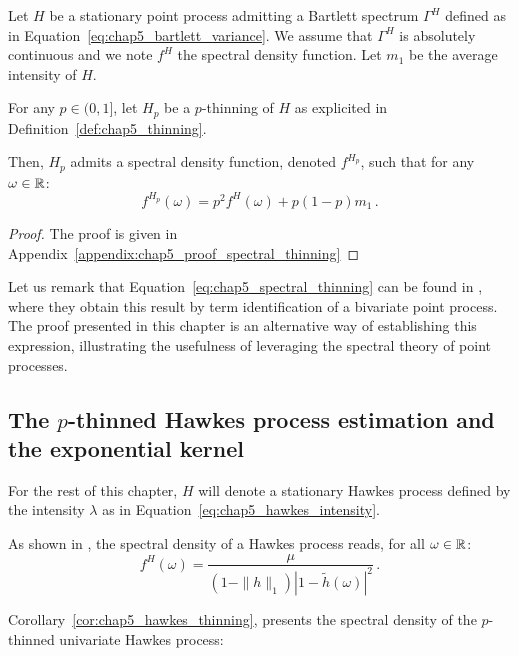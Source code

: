 \begin{proposition}\label{prop:chap5_spectral_thinning}
    Let $H$ be a stationary point process admitting a Bartlett spectrum $\Gamma^H$ defined as in Equation~\eqref{eq:chap5_bartlett_variance}.
    We assume that $\Gamma^H$ is absolutely continuous and we note $f^H$ the spectral density function. 
    Let $m_1$ be the average intensity of $H$.

    For any $p\in(0,1]$, let $H_p$ be a $p$-thinning of $H$ as explicited in Definition~\ref{def:chap5_thinning}.

    Then, $H_p$ admits a spectral density function, denoted $f^{H_p}$, such that for any $\omega\in{\mathbb R}$:
    \begin{equation}\label{eq:chap5_spectral_thinning}
        f^{H_p}(\omega) = p^2 f^H(\omega) + p(1-p)m_1\,.
    \end{equation}

\end{proposition}

\begin{proof}
    The proof is given in Appendix~\ref{appendix:chap5_proof_spectral_thinning}
\end{proof}

    Let us remark that Equation~\eqref{eq:chap5_spectral_thinning} can be found in \textcite[Equation 8.3.5]{DaleyV1}, where they obtain this result by term identification of a bivariate point process. 
    The proof presented in this chapter is an alternative way of establishing this expression,
    illustrating the usefulness of leveraging the spectral theory of point processes.


    \subsection{The $p$-thinned Hawkes process estimation and the exponential kernel}\label{sec:chap5_thinned_hawkes}

    For the rest of this chapter, 
    $H$ will denote a stationary Hawkes process defined by the intensity $\lambda$ as in Equation~\eqref{eq:chap5_hawkes_intensity}.

    As shown in \textcite{Hawkes1971}, the spectral density of a Hawkes process reads, for all $\omega\in{\mathbb R}$:
    \[f^H(\omega) = \frac{\mu}{(1-\|h\|_1)|1-\tilde h(\omega)|^2}\,.\]

    Corollary~\ref{cor:chap5_hawkes_thinning}, presents the spectral density of the $p$-thinned univariate Hawkes process:

